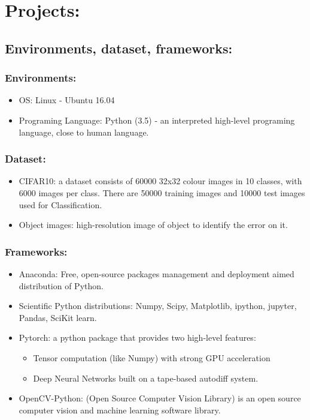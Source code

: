 \section{Projects:}
\subsection{Environments, dataset, frameworks:}
\subsubsection{Environments:}
\begin{itemize}
\item OS: Linux - Ubuntu 16.04
\item Programing Language: Python (3.5) - an interpreted high-level programing language, close to human language.
\end{itemize}
\subsubsection{Dataset:}
\begin{itemize}
\item CIFAR10: a dataset consists of 60000 32x32 colour images in 10 classes, with 6000 images per class. There are 50000 training images and 10000 test images used for Classification.
\item Object images: high-resolution image of object to identify the error on it.
\end{itemize}
\subsubsection{Frameworks:}
\begin{itemize}
\item Anaconda: Free, open-source packages management and deployment aimed distribution of Python.
\item Scientific Python distributions: Numpy, Scipy, Matplotlib, ipython, jupyter, Pandas, SciKit learn.
\item Pytorch: a python package that provides two high-level features:
\begin{itemize}
\item Tensor computation (like Numpy) with strong GPU acceleration
\item Deep Neural Networks built on a tape-based autodiff system. 
\end{itemize}
\item OpenCV-Python: (Open Source Computer Vision Library) is an open source computer vision and machine learning software library. 
\end{itemize}
